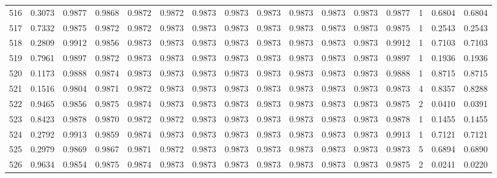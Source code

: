 \begin{tabular}{lrrrrrrrrrrrrrrr}
516 &      0.3073 &  0.9877 &  0.9868 &  0.9872 &  0.9872 &  0.9873 &  0.9873 &  0.9873 &  0.9873 &  0.9873 &   0.9873 &     0.9877 &      1 &                    0.6804 &                     0.6804 \\
517 &      0.7332 &  0.9875 &  0.9872 &  0.9872 &  0.9873 &  0.9873 &  0.9873 &  0.9873 &  0.9873 &  0.9873 &   0.9873 &     0.9875 &      1 &                    0.2543 &                     0.2543 \\
518 &      0.2809 &  0.9912 &  0.9856 &  0.9873 &  0.9873 &  0.9873 &  0.9873 &  0.9873 &  0.9873 &  0.9873 &   0.9873 &     0.9912 &      1 &                    0.7103 &                     0.7103 \\
519 &      0.7961 &  0.9897 &  0.9872 &  0.9873 &  0.9873 &  0.9873 &  0.9873 &  0.9873 &  0.9873 &  0.9873 &   0.9873 &     0.9897 &      1 &                    0.1936 &                     0.1936 \\
520 &      0.1173 &  0.9888 &  0.9874 &  0.9873 &  0.9873 &  0.9873 &  0.9873 &  0.9873 &  0.9873 &  0.9873 &   0.9873 &     0.9888 &      1 &                    0.8715 &                     0.8715 \\
521 &      0.1516 &  0.9804 &  0.9871 &  0.9872 &  0.9873 &  0.9873 &  0.9873 &  0.9873 &  0.9873 &  0.9873 &   0.9873 &     0.9873 &      4 &                    0.8357 &                     0.8288 \\
522 &      0.9465 &  0.9856 &  0.9875 &  0.9874 &  0.9873 &  0.9873 &  0.9873 &  0.9873 &  0.9873 &  0.9873 &   0.9873 &     0.9875 &      2 &                    0.0410 &                     0.0391 \\
523 &      0.8423 &  0.9878 &  0.9870 &  0.9872 &  0.9872 &  0.9873 &  0.9873 &  0.9873 &  0.9873 &  0.9873 &   0.9873 &     0.9878 &      1 &                    0.1455 &                     0.1455 \\
524 &      0.2792 &  0.9913 &  0.9859 &  0.9874 &  0.9873 &  0.9873 &  0.9873 &  0.9873 &  0.9873 &  0.9873 &   0.9873 &     0.9913 &      1 &                    0.7121 &                     0.7121 \\
525 &      0.2979 &  0.9869 &  0.9867 &  0.9871 &  0.9872 &  0.9873 &  0.9873 &  0.9873 &  0.9873 &  0.9873 &   0.9873 &     0.9873 &      5 &                    0.6894 &                     0.6890 \\
526 &      0.9634 &  0.9854 &  0.9875 &  0.9874 &  0.9873 &  0.9873 &  0.9873 &  0.9873 &  0.9873 &  0.9873 &   0.9873 &     0.9875 &      2 &                    0.0241 &                     0.0220 \\

\end{tabular}
